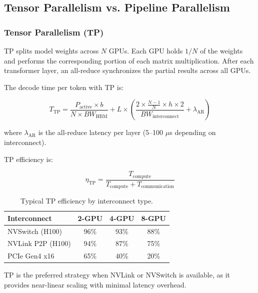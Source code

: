 \documentclass[11pt,a4paper]{article}
\theoremstyle{definition}
\begin{document}
\subsection{Tensor Parallelism vs. Pipeline Parallelism}

\subsubsection{Tensor Parallelism (TP)}

TP splits model weights across $N$ GPUs. Each GPU holds $1/N$ of the weights and performs the corresponding portion of each matrix multiplication. After each transformer layer, an all-reduce synchronizes the partial results across all GPUs.

The decode time per token with TP is:

\begin{equation}\label{eq:tp_decode}
T_{\text{TP}} = \frac{P_{\text{active}} \times b}{N \times BW_{\text{HBM}}} + L \times \left(\frac{2 \times \frac{N-1}{N} \times h \times 2}{BW_{\text{interconnect}}} + \lambda_{\text{AR}}\right)
\end{equation}

where $\lambda_{\text{AR}}$ is the all-reduce latency per layer (5--100 $\mu$s depending on interconnect).

TP efficiency is:

\begin{equation}\label{eq:tp_eff}
\eta_{\text{TP}} = \frac{T_{\text{compute}}}{T_{\text{compute}} + T_{\text{communication}}}
\end{equation}

\begin{table}[htbp]
\centering
\caption{Typical TP efficiency by interconnect type.}\label{tab:tp_eff}
\begin{tabular}{lccc}
\toprule
\textbf{Interconnect} & \textbf{2-GPU} & \textbf{4-GPU} & \textbf{8-GPU} \\
\midrule
NVSwitch (H100)    & 96\% & 93\% & 88\% \\
NVLink P2P (H100)  & 94\% & 87\% & 75\% \\
PCIe Gen4 x16      & 65\% & 40\% & 20\% \\
\bottomrule
\end{tabular}
\end{table}

TP is the preferred strategy when NVLink or NVSwitch is available, as it provides near-linear scaling with minimal latency overhead.
\end{document}
